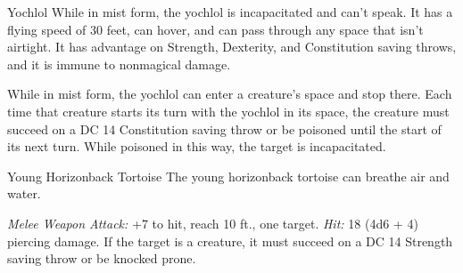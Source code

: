 \documentclass[10pt,a4paper,twoside,twocolumn,openany,nodeprecatedcode]{dndbook}
\begin{document}
\begin{DndMonster}[float=ht]{Yochlol}
While in mist form, the yochlol is incapacitated and can't speak. It has a flying speed of 30 feet, can hover, and can pass through any space that isn't airtight. It has advantage on Strength, Dexterity, and Constitution saving throws, and it is immune to nonmagical damage.

While in mist form, the yochlol can enter a creature's space and stop there. Each time that creature starts its turn with the yochlol in its space, the creature must succeed on a DC 14 Constitution saving throw or be poisoned until the start of its next turn. While poisoned in this way, the target is incapacitated.

\end{DndMonster}


\clearpage
{}

\begin{DndMonster}[float=ht]{Young Horizonback Tortoise}
\DndMonsterBasics[
armor-class = {15 (natural armor)},
hit-points = {\DndDice{8d12 + 16}},
speed = {30 ft.}
]
\DndMonsterAbilityScores[
 str = 19,
 dex = 11,
 con = 15,
 int = 2,
 wis = 12,
 cha = 5
]
\DndMonsterDetails[
languages = {understands Goblin but can't speak},
challenge = 3,
]
The young horizonback tortoise can breathe air and water.

\par
{}
\textsl{Melee Weapon Attack:} +7 to hit, reach 10 ft., one target. \textsl{Hit:} 18 (4d6 + 4) piercing damage. If the target is a creature, it must succeed on a DC 14 Strength saving throw or be knocked prone.

\end{DndMonster}


\clearpage



\end{document}
